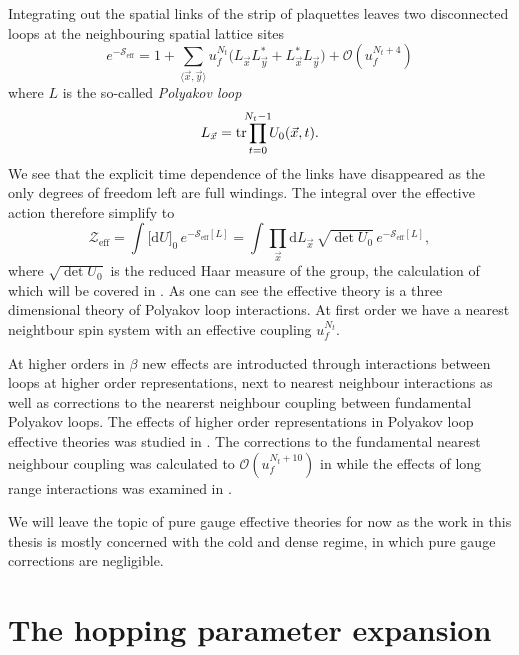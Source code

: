 Integrating out the spatial links of the strip of plaquettes leaves two
disconnected loops at the neighbouring spatial lattice sites
%
\begin{equation}
  e^{-\mathcal{S}_{\text{eff}}} = 1 + \sum_{\langle \vec{x}, \vec{y} \rangle} u_f^{N_t}
  \big( L_{\vec{x}} L^*_{\vec{y}} + L^*_{\vec{x}} L_{\vec{y}} \big) + \mathcal{O}(u_f^{N_t+4})
\end{equation}
%
where $L$ is the so-called \emph{Polyakov loop}
%
\begin{equation}
  L_{\vec{x}} = \tr \prod_{\mathclap{t=0}}^{\mathclap{N_t-1}} U_0(\vec{x},t) .
\end{equation}
%
We see that the explicit time dependence of the links have disappeared as the
only degrees of freedom left are full windings. The integral over the effective
action therefore simplify to
%
\begin{equation}
  \mathcal{Z}_{\text{eff}} = \int \big[\mathrm{d} U\big]_0 \,
    e^{-\mathcal{S}_{\text{eff}}[L]} 
  = \int \prod_{\vec{x}} \mathrm{d} L_{\vec{x}} \, \sqrt{\det U_0} \,
    e^{-\mathcal{S}_{\text{eff}}[L]} ,
\end{equation}
%
where $\sqrt{\det U_0}$ is the reduced Haar measure of the group, the calculation of
which will be covered in . As one can see the effective
theory is a three dimensional theory of Polyakov loop interactions. At first
order we have a nearest neightbour spin system with an effective coupling
$u_f^{N_t}$.

At higher orders in $\beta$ new effects are introducted through interactions
between loops at higher order representations, next to nearest neighbour
interactions as well as corrections to the nearerst neighbour coupling between
fundamental Polyakov loops. The effects of higher order representations in
Polyakov loop effective theories was studied in \citep{Wozar:2007tz}. The
corrections to the fundamental nearest neighbour coupling was calculated to 
$\mathcal{O}(u_f^{N_t + 10})$ in \citep{Langelage:2010yr} while the effects of
long range interactions was examined in \citep{Bergner:2015rza}.

We will leave the topic of pure gauge effective theories for now as the work in
this thesis is mostly concerned with the cold and dense regime, in which pure
gauge corrections are negligible.

\section{The hopping parameter expansion}

